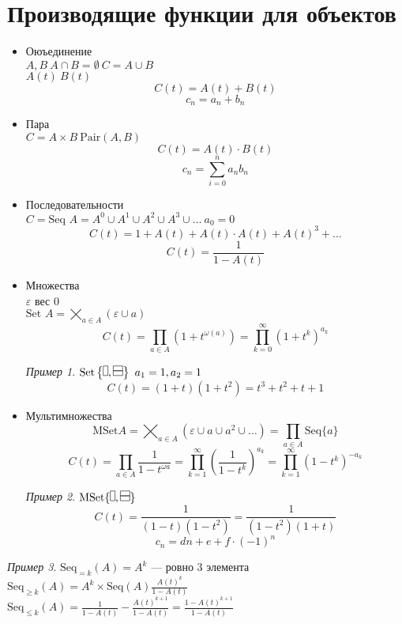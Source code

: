 \documentclass[oneside]{book}
\theoremstyle{plain}
\theoremstyle{remark}
\newtheorem*{examp}{Пример}
\theoremstyle{definition}
\begin{document}
\section{Производящие функции для объектов}
\label{sec:orga10c293}
\begin{itemize}
\item Оюъединение \\
\(A, B\ A \cap B = \emptyset\ C = A \cup B\) \\
\(A(t)\ B(t)\)
\[ C(t) = A(t) + B(t)\]
\[ c_n = a_n + b_n \]
\item Пара \\
\(C = A \times B\ \text{Pair}(A, B)\)
\[C(t) = A(t) \cdot B(t)\] 
\[ c_n = \sum_{i = 0}^na_nb_n \]
\item Последовательности \\
\(C = \text{Seq }A = A^0 \cup A^1 \cup A^2 \cup A^3 \cup \dots\ a_0 = 0\)
\[ C(t) = 1 + A(t) + A(t)\cdot A(t) + A(t)^3 + \dots \]
\[ C(t) = \frac{1}{1 - A(t)} \]
\item Множества \\
\(\varepsilon\) вес \(0\) \\
\(\text{Set }A = \bigtimes_{a \in A} (\varepsilon \cup a)\) \\
\[ C(t) = \prod_{a \in A}(1 + t^{\omega(a)}) = \prod_{k = 0}^\infty (1 + t^k)^{a_k} \]
\begin{examp}
\(\text{Set}\left\{\vdomino, \hdomino\right\}\ a_1 = 1,a_2 = 1\) \\
\[ C(t) = (1 + t)(1 + t^2) = t^3 + t^2 + t + 1 \]
\end{examp}
\item Мультимножества \\
\[\text{MSet} A = \bigtimes_{a \in A}(\varepsilon \cup a \cup a^2 \cup \dots) = \prod_{a \in A}\text{Seq}\{a\}\]
\[ C(t) = \prod_{a \in A}\frac{1}{1 - t^{\omega{a}}} = \prod_{k = 1}^\infty\left(\frac{1}{1 - t^k}\right)^{a_k} = \prod_{k = 1}^\infty(1 - t^k)^{-a_k}\]
\begin{examp}
\(\text{MSet}\{\vdomino, \hdomino\}\)
\[ C(t) = \frac{1}{(1 - t)(1 - t^2)} = \frac{1}{(1 - t^2)(1 + t)} \]
\[ c_n = dn + e + f\cdot(-1)^n \]
\end{examp}
\end{itemize}
\begin{examp}
\(\text{Seq}_{=k}(A) = A^k\) --- ровно 3 элемента \\
\(\text{Seq}_{\ge k}(A) = A^k \times \text{Seq}(A)\frac{A(t)^k}{1 - A(t)}\) \\
\(\text{Seq}_{\le k}(A) = \frac{1}{1 - A(t)} - \frac{A(t)^{k + 1}}{1 - A(t)} = \frac{1 - A(t)^{k + 1}}{1 - A(t)}\)
\end{examp}
\end{document}
